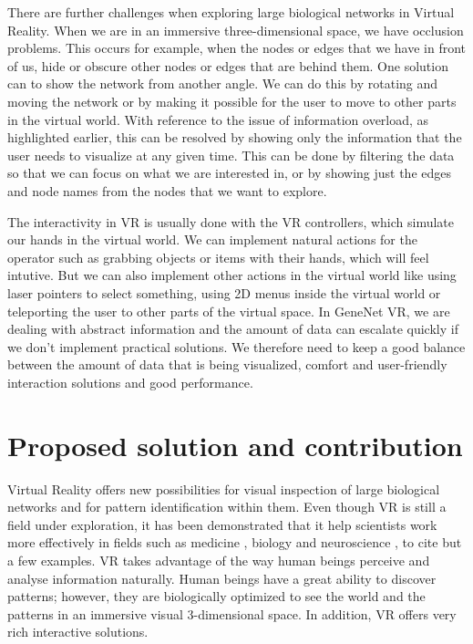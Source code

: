 There are further challenges when exploring large biological networks in Virtual Reality. When we are in an immersive three-dimensional space, we have occlusion problems. This occurs for example, when the nodes or edges that we have in front of us, hide or obscure other nodes or edges that are behind them. One solution can to show the network from another angle. We can do this by rotating and moving the network or by making it possible for the user to move to other parts in the virtual world. With reference to the issue of information overload, as highlighted earlier, this can be resolved by showing only the information that the user needs to visualize at any given time. This can be done by filtering the data so that we can focus on what we are interested in, or by showing just the edges and node names from the nodes that we want to explore.

The interactivity in VR is usually done with the VR controllers, which simulate our hands in the virtual world. We can implement natural actions for the operator such as grabbing objects or items with their hands, which will feel intutive. But we can also implement other actions in the virtual world like using laser pointers to select something, using 2D menus inside the virtual world or teleporting the user to other parts of the virtual space. In GeneNet VR, we are dealing with abstract information and the amount of data can escalate quickly if we don't implement practical solutions. We therefore need to keep a good balance between the amount of data that is being visualized, comfort and user-friendly interaction solutions and good performance.

\section{Proposed solution and contribution}

Virtual Reality offers new possibilities for visual inspection of large biological networks and for pattern identification within them. Even though VR is still a field under exploration, it has been demonstrated that it help scientists work more effectively in fields such as medicine \cite{Laver11} \cite{xia_ip_samman_wong_gateno_wang_yeung_kot_tideman_2001} \cite{brain_damage_rehab}, biology \cite{bioinformatics_bti581} \cite{thorley_lawson_duca_shapiro_2008} and neuroscience \cite{bohil_alicea_biocca_2011}\cite{minderer_harvey_donato_moser_2016}, to  cite but a few examples. VR takes advantage of the way human beings perceive and analyse information naturally. Human beings have a great ability to discover patterns; however, they are biologically optimized to see the world and the patterns in an immersive visual 3-dimensional space. In addition, VR offers very rich interactive solutions.

